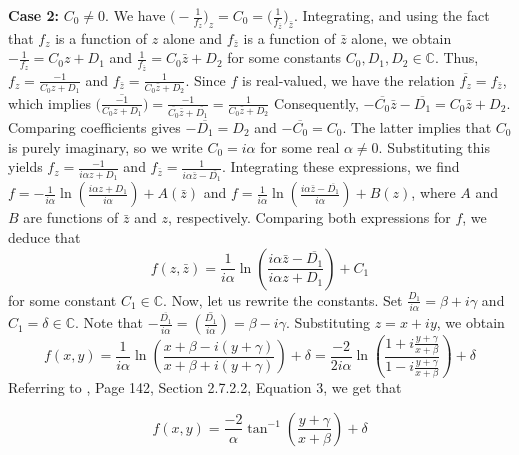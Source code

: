 \documentclass[12pt]{article}
\theoremstyle{plain}
\theoremstyle{definition}
\theoremstyle{remark}
\begin{document}
   \textbf{Case 2: } \(C_0 \neq 0\). We have \(\big( -\frac{1}{f_z} \big)_z = C_0 = \big( \frac{1}{f_{\bar{z}}} \big)_{\bar{z}}\). Integrating, and using the fact that \(f_z\) is a function of \(z\) alone and \(f_{\bar{z}}\) is a function of \(\bar z\) alone, we obtain \(-\frac{1}{f_z} = C_0 z + D_1\) and \(\frac{1}{f_{\bar{z}}} = C_0 \bar{z} + D_2\) for some constants \(C_0, D_1, D_2 \in \mathbb{C}\). Thus, \(f_z = \frac{-1}{C_0 z + D_1}\) and \(f_{\bar{z}} = \frac{1}{C_0 \bar{z} + D_2}\). Since \(f\) is real-valued, we have the relation \(\overline{f_z} = f_{\bar{z}}\), which implies  \(\overline{\big(\frac{-1}{C_0z+D_1}\big)}=\frac{-1}{\overline{C_0}\bar{z}+\overline{D_1}} =\frac{1}{C_0\bar{z}+D_2}\) Consequently, \(-\overline{C_0} \bar{z} - \overline{D_1} = C_0 \bar{z} + D_2\). Comparing coefficients gives \(-\overline{D_1} = D_2\) and \(-\overline{C_0} = C_0\). The latter implies that \(C_0\) is purely imaginary, so we write \(C_0 = i\alpha\) for some real \(\alpha \neq 0\). Substituting this yields \(f_z = \frac{-1}{i \alpha z + D_1}\) and \(f_{\bar{z}} = \frac{1}{i \alpha \bar{z} - \overline{D_1}}\). Integrating these expressions, we find \(f = -\frac{1}{i\alpha} \ln \left( \frac{i\alpha z + D_1}{i\alpha} \right) + A(\bar{z})\) and \(f = \frac{1}{i\alpha} \ln \left( \frac{i\alpha \bar{z} - \overline{D_1}}{i\alpha} \right) + B(z)\), where \(A\) and \(B\) are functions of \(\bar{z}\) and \(z\), respectively. Comparing both expressions for \(f\), we deduce that 
   \[
    f(z, \bar{z}) = \frac{1}{i\alpha} \ln \left( \frac{i\alpha \bar{z} - \overline{D_1}}{i\alpha z + D_1} \right) + C_1
   \]
   for some constant \(C_1 \in \mathbb{C}\). Now, let us rewrite the constants. Set \(\frac{D_1}{i\alpha} = \beta + i\gamma\) and \(C_1 = \delta \in \mathbb{C}\). Note that \(-\frac{\overline{D_1}}{i\alpha} = \overline{\left( \frac{D_1}{i\alpha} \right)} = \beta - i\gamma\). Substituting \(z = x + iy\), we obtain
   \[
     f(x,y) = \frac{1}{i\alpha} \ln \left( \frac{x + \beta - i(y + \gamma)}{x + \beta + i(y + \gamma)} \right) + \delta = \frac{-2}{2i\alpha} \ln \left( \frac{1 + i\frac{y+\gamma}{x+\beta}}{1 - i\frac{y+\gamma}{x+\beta}} \right) + \delta
   \]
   Referring to \cite{JD}, Page 142, Section 2.7.2.2, Equation 3, we get that 
   
   \begin{equation}
   	\label{eqn: case h=0 Helicoid}
   	\boxed{f(x,y) = \frac{-2}{\alpha} \tan^{-1} \left( \frac{y + \gamma}{x + \beta} \right) + \delta}
   \end{equation}
\end{document}
